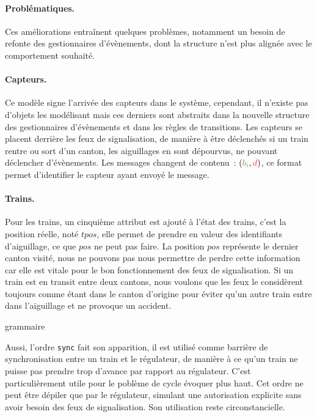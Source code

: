 \documentclass[oneside, a4paper, 11pt]{book}
\newcommand{\dirFmt}[1]{{\color{dircolor} #1}}
\newcommand{\posFmt}[1]{{\color{poscolor}{#1}}}
\newcommand{\bid}[1]{\ensuremath{\posFmt{b_{#1}}}}
\begin{document}
\paragraph{Problématiques.} Ces améliorations entraînent quelques problèmes, notamment un besoin de refonte des gestionnaires d'évènements, dont la structure n'est plus alignée avec le comportement souhaité. 

\paragraph{Capteurs.} Ce modèle signe l'arrivée des capteurs dans le système, cependant, il n'existe pas d'objets les modélisant mais ces derniers sont abstraits dans la nouvelle structure des gestionnaires d'évènements et dans les règles de transitions.
Les capteurs se placent derrière les feux de signalisation, de manière à être déclenchés si un train rentre ou sort d'un canton, les aiguillages en sont dépourvus, ne pouvant déclencher d'évènements. Les messages changent de contenu~: $(\bid{i},\dirFmt{d})$, ce format permet d'identifier le capteur ayant envoyé le message.

\paragraph{Trains.} Pour les trains, un cinquième attribut est ajouté à l'état des trains, c'est la position réelle, noté $tpos$, elle permet de prendre en valeur des identifiants d'aiguillage, ce que $pos$ ne peut pas faire.
La position $pos$ représente le dernier canton visité, nous ne pouvons pas nous permettre de perdre cette information car elle est vitale pour le bon fonctionnement des feux de signalisation. Si un train est en transit entre deux cantons, nous voulons que les feux le considèrent toujours comme étant dans le canton d'origine pour éviter qu'un autre train entre dans l'aiguillage et ne provoque un accident.

\begin{sidebox}
	grammaire
\end{sidebox}

Aussi, l'ordre \texttt{sync} fait son apparition, il est utilisé comme barrière de synchronisation entre un train et le régulateur, de manière à ce qu'un train ne puisse pas prendre trop d'avance par rapport au régulateur. C'est particulièrement utile pour le poblème de cycle évoquer plus haut. Cet ordre ne peut être dépiler que par le régulateur, simulant une autorisation explicite sans avoir besoin des feux de signalisation.
Son utilisation reste circonstancielle.
\end{document}
